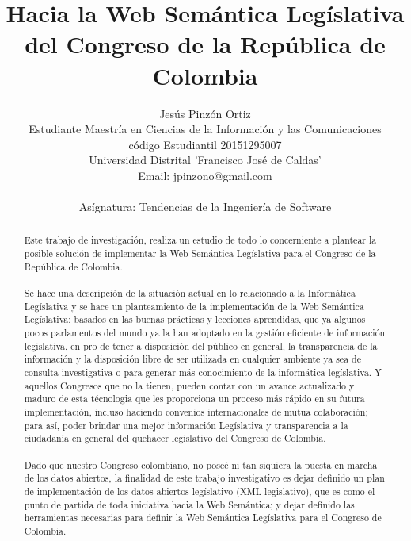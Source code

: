 \documentclass[conference]{IEEEtran}\usepackage[]{graphicx}\usepackage[]{color}
\begin{document}
	
	
	\title{Hacia la Web Semántica Legíslativa del Congreso de la República de Colombia}
	
	
	\author{Jesús Pinzón Ortiz\\
		Estudiante Maestría en Ciencias de la Información y las Comunicaciones\\
		código Estudiantil 20151295007\\
		Universidad Distrital 'Francisco José de Caldas'\\
		Email: jpinzono@gmail.com\\ \\
		Asígnatura: Tendencias de la Ingeniería de Software}
	
	
	\maketitle
	
	\begin{abstract}
		Este trabajo de investigación, realiza un estudio de todo lo concerniente a plantear la posible solución de implementar la Web Semántica Legíslativa para el Congreso de la República de Colombia. \\ \\
		Se hace una descripción de la situación actual en lo relacionado a la Informática Legíslativa y se hace un planteamiento de la implementación de la Web Semántica Legíslativa; basados en las buenas prácticas y lecciones aprendidas, que ya algunos pocos parlamentos del mundo ya la han adoptado en la gestión eficiente de información legislativa, en pro de tener a disposición del público en general, la transparencia de la información y la disposición libre de ser utilizada en cualquier ambiente ya sea de consulta investigativa o para generar más conocimiento de la informática legíslativa.  Y aquellos Congresos que no la tienen, pueden contar con un avance actualizado y maduro de esta técnologia que les proporciona un proceso más rápido en su futura implementación, incluso haciendo convenios internacionales de mutua colaboración; para así, poder brindar una mejor información Legíslativa y transparencia a la ciudadanía en general del quehacer legislativo del Congreso de Colombia. \\ \\
		Dado que nuestro Congreso colombiano, no poseé ni tan siquiera la puesta en marcha de los datos abiertos, la finalidad de este trabajo investigativo es dejar definido un plan de implementación de los datos abiertos legíslativo (XML legislativo), que es como el punto de partida de toda iniciativa hacia la Web Semántica; y dejar definido las herramientas necesarias para definir la Web Semántica Legíslativa para el Congreso de Colombia.
	\end{abstract}
\end{document}

